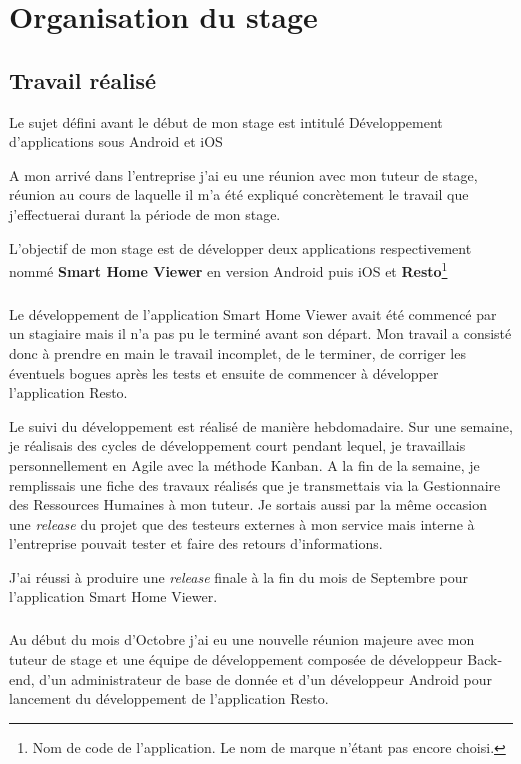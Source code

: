 \chapter{Organisation du stage}
\section*{Travail réalisé}
Le sujet défini avant le début de mon stage est intitulé \og Développement d'applications sous \gls{Android} et \gls{iOS}   

A mon arrivé dans l'entreprise j'ai eu une réunion avec mon tuteur de stage, réunion au cours de laquelle il m'a été expliqué concrètement le travail que j'effectuerai durant la période de mon stage.

L'objectif de mon stage est de développer deux applications respectivement nommé \textbf{Smart Home Viewer} en version \gls{Android} puis \gls{iOS} et \textbf{Resto}\footnote{Nom de code de l'application. Le nom de marque n'étant pas encore choisi.}
\paragraph*{}
Le développement de l'application Smart Home Viewer avait été commencé par un stagiaire mais il n'a pas pu le terminé avant son départ. Mon travail a consisté donc à prendre en main le travail incomplet, de le terminer, de corriger les éventuels bogues après les tests et ensuite de commencer à développer l'application Resto.

Le suivi du développement est réalisé de manière hebdomadaire. Sur une semaine, je réalisais des cycles de développement court pendant lequel, je travaillais personnellement en Agile avec la méthode Kanban. A la fin de la semaine, je remplissais une fiche des travaux réalisés que je transmettais via la Gestionnaire des Ressources Humaines à mon tuteur. Je sortais aussi par la même occasion une \textit{release} du projet que des testeurs externes à mon service mais interne à l'entreprise pouvait tester et faire des retours d'informations.

J'ai réussi à produire une \textit{release} finale à la fin du mois de Septembre pour l'application Smart Home Viewer.
\paragraph*{}

Au début du mois d'Octobre j'ai eu une nouvelle réunion majeure avec mon tuteur de stage et une équipe de développement composée de développeur Back-end, d'un administrateur de base de donnée et d'un développeur \gls{Android} pour lancement du développement de l'application Resto.

